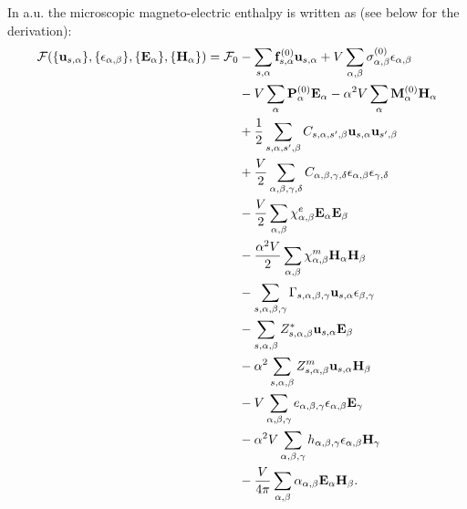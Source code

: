 \documentclass[12pt,a4paper]{article}
\begin{document}
\newpage
{\color{web-blue} In a.u. the microscopic magneto-electric enthalpy
is written as (see below for the derivation):
\begin{align}
\mathcal{F}(\{{\bf u}_{s,\alpha}\}, \{\epsilon_{\alpha,\beta}\},
\{ {\bf E}_\alpha\}, \{{\bf H}_\alpha\})=\mathcal{F}_0 &-
\sum_{s,\alpha} {\bf f}^{(0)}_{s,\alpha} {\bf u}_{s,\alpha}
+ V \sum_{\alpha,\beta}
\sigma_{\alpha,\beta}^{(0)} \epsilon_{\alpha,\beta} \nonumber \\ 
&- V \sum_{\alpha} {\bf P}^{(0)}_\alpha {\bf E}_\alpha - 
\alpha^2 V \sum_{\alpha}
{\bf M}^{(0)}_\alpha {\bf H}_\alpha \nonumber \\
&+ {1\over 2}
\sum_{s,\alpha,s',\beta} C_{s,\alpha,s',\beta} {\bf u}_{s,\alpha}
{\bf u}_{s',\beta}\nonumber \\
&+ {V\over 2}\sum_{\alpha,\beta,\gamma,\delta} 
C_{\alpha,\beta,\gamma,\delta}  
\epsilon_{\alpha,\beta}
\epsilon_{\gamma,\delta} \nonumber \\
&- {V\over 2} \sum_{\alpha,\beta} 
\chi^e_{\alpha,\beta}
{\bf E}_{\alpha}
{\bf E}_{\beta} \nonumber \\
&- {\alpha^2 V \over 2}  \sum_{\alpha,\beta} 
\chi^m_{\alpha,\beta}
{\bf H}_{\alpha}
{\bf H}_{\beta} \nonumber \\
&- \sum_{s,\alpha,\beta,\gamma}
\Gamma_{s,\alpha,\beta,\gamma} {\bf u}_{s,\alpha}
\epsilon_{\beta,\gamma}\nonumber \\
&- \sum_{s,\alpha,\beta} Z^*_{s,\alpha,\beta} 
{\bf u}_{s,\alpha} {\bf E}_{\beta} \nonumber \\
&- \alpha^2 \sum_{s,\alpha,\beta} 
Z^m_{s,\alpha,\beta} {\bf u}_{s,\alpha}{\bf H}_{\beta} \nonumber \\
&- V \sum_{\alpha,\beta,\gamma} e_{\alpha,\beta,\gamma} 
\epsilon_{\alpha,\beta} {\bf E}_{\gamma} \nonumber \\
&- \alpha^2 V \sum_{\alpha,\beta,\gamma}  h_{\alpha,\beta,\gamma} 
\epsilon_{\alpha,\beta} {\bf H}_{\gamma} \nonumber \\
&- {V \over 4 \pi} \sum_{\alpha,\beta} 
\alpha_{\alpha,\beta} {\bf E}_{\alpha}
{\bf H}_{\beta}.
\end{align}
}
\end{document}
